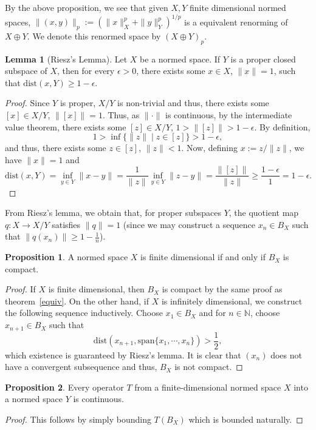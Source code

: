 \documentclass[
]{article}
\theoremstyle{definition}
\theoremstyle{definition}
\newtheorem{lemma}{Lemma}[section]
\newtheorem{proposition}{Proposition}[section]
\begin{document}
By the above proposition, we see that given \(X, Y\) finite dimensional 
normed spaces, \(\|(x, y)\|_p := (\|x\|_X^p + \|y\|_Y^p)^{1 / p}\) is a 
equivalent renorming of \(X \oplus Y\). We denote this renormed space by 
\((X \oplus Y)_p\).

\begin{lemma}[Riesz's Lemma]
  Let \(X\) be a normed space. If \(Y\) is a proper closed subspace of \(X\), 
  then for every \(\epsilon > 0\), there exists some \(x \in X\), \(\|x\| = 1\), 
  such that \(\text{dist} (x, Y) \ge 1 - \epsilon\).
\end{lemma}
\begin{proof}
  Since \(Y\) is proper, \(X / Y\) is non-trivial and thus, there exists some 
  \([x] \in X / Y\), \(\|[x]\| = 1\). Thus, as \(\|\cdot\|\) is continuous, 
  by the intermediate value theorem, there exists some \([z] \in X / Y\), 
  \(1 > \|[z]\| > 1 - \epsilon\). By definition, 
  \[1 > \inf \{\|z\| \mid z \in [z]\} > 1 - \epsilon,\]
  and thus, there exists some \(z \in [z]\), \(\|z\| < 1\). Now, defining 
  \(x := z / \|z\|\), we have \(\|x\| = 1\) and 
  \[\text{dist}(x, Y) = \inf_{y \in Y} \|x - y\| = 
    \frac{1}{\|z\|} \inf_{y \in Y} \|z - y\| = \frac{\|[z]\|}{\|z\|} \ge 
    \frac{1 - \epsilon}{1} = 1 - \epsilon.\]
\end{proof}

From Riesz's lemma, we obtain that, for proper subspaces \(Y\), the 
quotient map \(q : X \to X / Y\) satisfies \(\|q\| = 1\) (since 
we may construct a sequence \(x_n \in B_X\) such that \(\|q(x_n)\| \ge 
1 - \frac{1}{n}\)).    

\begin{proposition}
  A normed space \(X\) is finite dimensional if and only if \(B_X\) is compact.
\end{proposition}
\begin{proof}
  If \(X\) is finite dimensional, then \(B_X\) is compact by the same proof as 
  theorem~\ref{equiv}. On the other hand, if \(X\) is infinitely dimensional, 
  we construct the following sequence inductively. Choose \(x_1 \in B_X\) and 
  for \(n \in \mathbb{N}\), choose \(x_{n + 1} \in B_X\) such that 
  \[\text{dist}(x_{n + 1}, \text{span}\{x_1, \cdots, x_n\}) > \frac{1}{2},\]
  which existence is guaranteed by Riesz's lemma. It is clear that \((x_n)\) 
  does not have a convergent subsequence and thus, \(B_X\) is not compact. 
\end{proof}

\begin{proposition}
  Every operator \(T\) from a finite-dimensional normed space \(X\) into a 
  normed space \(Y\) is continuous.
\end{proposition}
\begin{proof}
  This follows by simply bounding \(T(B_X)\) which is bounded naturally.
\end{proof}
\end{document}
